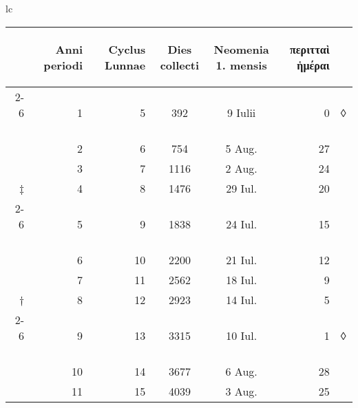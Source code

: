 %
\begin{tabular}{lc}
\begin{tabular}[t]{r rrccr l}
~ &
\begin{rotate}{60}Anni periodi\end{rotate} &
\begin{rotate}{60}Cyclus Lunnae\end{rotate} &
\begin{rotate}{60}Dies collecti\end{rotate} &
\begin{rotate}{60}\hspace{5pt}\parbox[t]{3.5cm}{Neomenia\\1. mensis}\end{rotate} &
\begin{rotate}{60}\textgreek{περιτταὶ ἡμέραι}\end{rotate} &
~
\\
\cline{2-6}
~ &  1 &  5 &  392 &  9 Iulii & 0 & ◊ \\
~ &  2 &  6 &  754 &  5 Aug. & 27 & ~ \\
~ &  3 &  7 & 1116 &  2 Aug. & 24 & ~ \\
‡ &  4 &  8 & 1476 & 29 Iul. & 20 \\
\cline{2-6}
~ &  5 &  9 & 1838 & 24 Iul. & 15 \\
~ &  6 & 10 & 2200 & 21 Iul. & 12 \\
~ &  7 & 11 & 2562 & 18 Iul. &  9 \\
† &  8 & 12 & 2923 & 14 Iul. &  5 \\
\cline{2-6}
~ &  9 & 13 & 3315 & 10 Iul. &  1 & ◊\\
~ & 10 & 14 & 3677 &  6 Aug. & 28 \\
~ & 11 & 15 & 4039 &  3 Aug. & 25 \\

\end{tabular}
\end{tabular}
